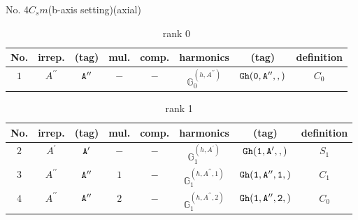 \documentclass[fleqn,8pt]{jsarticle}
\begin{document}
\setcounter{MaxMatrixCols}{16}

\begin{center}
\LARGE
No. 4\quad$C_{s}$\quad$m$\quad(b-axis setting)\quad[ monoclinic ] (axial)
\end{center}
\begin{table}[ht!]
\begin{center}
\caption{rank 0}
\renewcommand{\arraystretch}{1.3}
\begin{tabular}{cccccccc} \hline \hline
No. & irrep. & (tag) & mul. & comp. & harmonics & (tag) & definition \\ \hline
$ 1 $ & $ A^{\prime\prime} $ & $ {\tt A''} $ & $ - $ & $ - $ & $ \mathbb{G}_{0}^{(h,A^{\prime\prime})} $ & $ {\tt Gh(0,A'',,)} $ & $ C_{0} $ \\
 \hline \hline
\end{tabular}
\end{center}
\end{table}
\begin{table}[ht!]
\begin{center}
\caption{rank 1}
\renewcommand{\arraystretch}{1.3}
\begin{tabular}{cccccccc} \hline \hline
No. & irrep. & (tag) & mul. & comp. & harmonics & (tag) & definition \\ \hline
$ 2 $ & $ A^{\prime} $ & $ {\tt A'} $ & $ - $ & $ - $ & $ \mathbb{G}_{1}^{(h,A^{\prime})} $ & $ {\tt Gh(1,A',,)} $ & $ S_{1} $ \\
$ 3 $ & $ A^{\prime\prime} $ & $ {\tt A''} $ & $ 1 $ & $ - $ & $ \mathbb{G}_{1}^{(h,A^{\prime\prime},1)} $ & $ {\tt Gh(1,A'',1,)} $ & $ C_{1} $ \\
$ 4 $ & $ A^{\prime\prime} $ & $ {\tt A''} $ & $ 2 $ & $ - $ & $ \mathbb{G}_{1}^{(h,A^{\prime\prime},2)} $ & $ {\tt Gh(1,A'',2,)} $ & $ C_{0} $ \\
 \hline \hline
\end{tabular}
\end{center}
\end{table}
\end{document}
